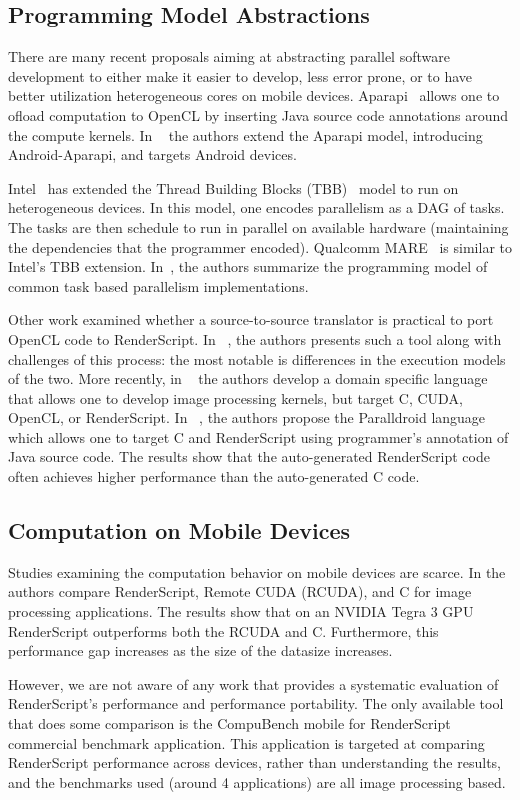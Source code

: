 \subsection{Programming Model Abstractions}


There are many recent proposals aiming at abstracting parallel software
development to either make it easier to develop, less error prone, or to have
better utilization heterogeneous cores on mobile devices.
Aparapi~\cite{Aparapi_web} allows one to ofload computation to OpenCL by
inserting Java source code annotations around the compute kernels. In
~\cite{6704508} the authors extend the Aparapi model, introducing
Android-Aparapi, and targets Android devices.

Intel~\cite{barik2014efficient} has extended the Thread Building Blocks
(TBB)~\cite{reinders2007intel} model to run on heterogeneous devices. In this
model, one encodes parallelism as a DAG of tasks.  The tasks are then schedule
to run in parallel on available hardware (maintaining the dependencies that the
programmer encoded).  Qualcomm MARE~\cite{MARE_qc} is similar to Intel's TBB
extension.  In~\cite{khaldi2013task}, the authors summarize the programming
model of common task based parallelism implementations.

Other work examined whether a source-to-source translator is practical to port
OpenCL code to RenderScript.  In ~\cite{yang2012o2render}, the authors presents
such a tool along with challenges of this process: the most notable is
differences in the execution models of the two.  More recently, in
~\cite{6800300} the authors develop a domain specific language that allows one
to develop image processing kernels, but target C, CUDA, OpenCL, or
RenderScript. In ~\cite{alejandro2014performance}, the authors propose the
Paralldroid language which allows one to target C and RenderScript using
programmer's annotation of Java source code. The results show that the
auto-generated RenderScript code often achieves higher performance than the
auto-generated C code. 

\subsection{Computation on Mobile Devices}

Studies examining the computation behavior on mobile devices are scarce.  In
\cite{kemp2013using} the authors compare RenderScript, Remote CUDA (RCUDA), and
C for image processing applications. The results show that on an NVIDIA Tegra 3
GPU RenderScript outperforms both the RCUDA and C. Furthermore, this performance
gap increases as the size of the datasize increases.

However, we are not aware of any work that provides a systematic evaluation of
RenderScript's performance and performance portability.  The only available tool
that does some comparison is the CompuBench mobile for
RenderScript~\cite{compuBenchMobile} commercial benchmark application.  This
application is targeted at comparing RenderScript performance across devices,
rather than understanding the results, and the benchmarks used (around 4
applications) are all image processing based.


